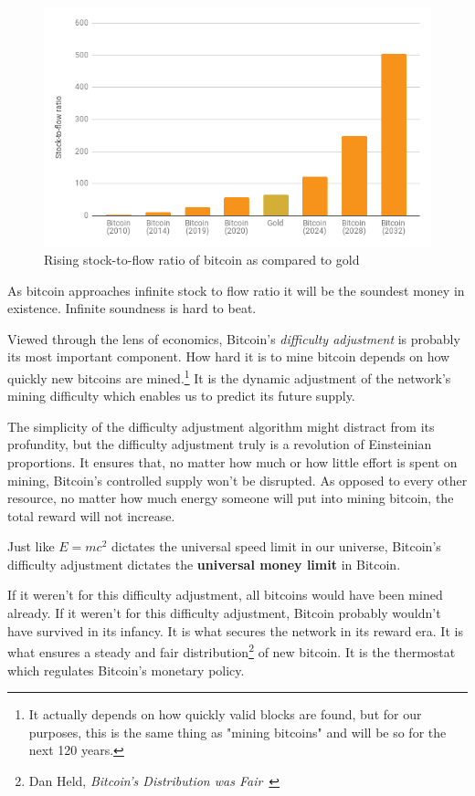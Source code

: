 \begin{figure}
  \includegraphics{assets/images/soundness-over-time.png}
  \caption{Rising stock-to-flow ratio of bitcoin as compared to gold}
  \label{fig:soundness-over-time}
\end{figure}

As bitcoin approaches infinite stock to flow ratio it will be the
soundest money in existence. Infinite soundness is hard to beat.

Viewed through the lens of economics, Bitcoin's \textit{difficulty adjustment}
is probably its most important component. How hard it is to mine bitcoin depends
on how quickly new bitcoins are mined.\footnote{It actually depends on how
quickly valid blocks are found, but for our purposes, this is the same thing as
"mining bitcoins" and will be so for the next 120 years.} It is the dynamic
adjustment of the network's mining difficulty which enables us to predict its
future supply.

The simplicity of the difficulty adjustment algorithm might distract
from its profundity, but the difficulty adjustment truly is a revolution
of Einsteinian proportions. It ensures that, no matter how much or how
little effort is spent on mining, Bitcoin's controlled supply won't be
disrupted. As opposed to every other resource, no matter how much
energy someone will put into mining bitcoin, the total reward will not
increase.

Just like $E=mc^2$ dictates the universal speed limit in our universe,
Bitcoin's difficulty adjustment dictates the \textbf{universal money limit}
in Bitcoin.

If it weren't for this difficulty adjustment, all bitcoins would have been mined
already. If it weren't for this difficulty adjustment, Bitcoin probably wouldn't
have survived in its infancy. It is what secures the network in its reward era.
It is what ensures a steady and fair distribution\footnote{Dan Held,
\textit{Bitcoin's Distribution was Fair}~\cite{distribution-was-fair}} of new
bitcoin. It is the thermostat which regulates Bitcoin's monetary policy.

